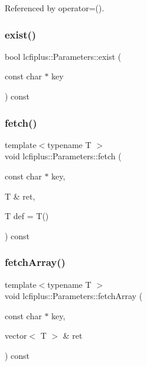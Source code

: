 Referenced by operator=().

\mbox{\label{classlcfiplus_1_1Parameters_ad64bd6233648fb10d36408bc6e1ce60e}} 
\subsubsection{exist()}
{\footnotesize\ttfamily bool lcfiplus\+::\+Parameters\+::exist (\begin{DoxyParamCaption}\item[{const char $\ast$}]{key }\end{DoxyParamCaption}) const\hspace{0.3cm}{\ttfamily [inline]}}

\mbox{\label{classlcfiplus_1_1Parameters_a32c2c737ce139d02dbdb7759caaa3d6e}} 
\subsubsection{fetch()}
{\footnotesize\ttfamily template$<$typename T $>$ \\
void lcfiplus\+::\+Parameters\+::fetch (\begin{DoxyParamCaption}\item[{const char $\ast$}]{key,  }\item[{T \&}]{ret,  }\item[{T}]{def = {\ttfamily T()} }\end{DoxyParamCaption}) const\hspace{0.3cm}{\ttfamily [inline]}}

\mbox{\label{classlcfiplus_1_1Parameters_ac6aae83fccf3947a0f0e44e96e3eb28b}} 
\subsubsection{fetch\+Array()}
{\footnotesize\ttfamily template$<$typename T $>$ \\
void lcfiplus\+::\+Parameters\+::fetch\+Array (\begin{DoxyParamCaption}\item[{const char $\ast$}]{key,  }\item[{vector$<$ T $>$ \&}]{ret }\end{DoxyParamCaption}) const\hspace{0.3cm}{\ttfamily [inline]}}



